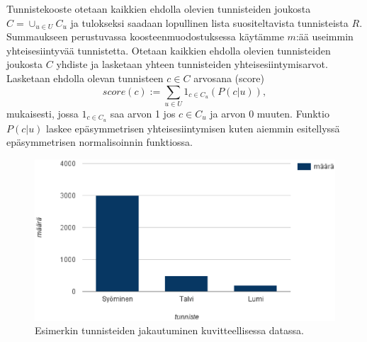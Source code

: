 \documentclass[12pt,finnish]{tktltiki2}
\theoremstyle{definition}
\theoremstyle{remark}
\begin{document}
Tunnistekooste otetaan kaikkien ehdolla olevien tunnisteiden joukosta $C = \cup_{u\in U}C_u$ ja tulokseksi saadaan lopullinen lista suositeltavista tunnisteista $R$. Summaukseen perustuvassa koosteenmuodostuksessa käytämme $m$:ää useimmin yhteisesiintyvää tunnistetta. Otetaan kaikkien ehdolla olevien tunnisteiden joukosta $C$ yhdiste ja lasketaan yhteen tunnisteiden yhteisesiintymisarvot. Lasketaan ehdolla olevan tunnisteen $c \in C$ arvosana (score)
\begin{displaymath}
score(c) := \sum_{u\in U}1_{c\in C_u}(P(c|u)),
\end{displaymath}
mukaisesti, jossa $1_{c\in C_u}$ saa arvon 1 jos $c\in C_u$ ja arvon 0 muuten. Funktio $P(c|u)$ laskee epäsymmetrisen yhteisesiintymisen kuten aiemmin esitellyssä epäsymmetrisen normalisoinnin funktiossa.

\begin{figure}[]
\includegraphics[width = 390pt]{tunnisteet.eps}\caption{Esimerkin tunnisteiden jakautuminen kuvitteellisessa datassa.}
\label{esimerkkitunnisteet}
\end{figure}
\end{document}
